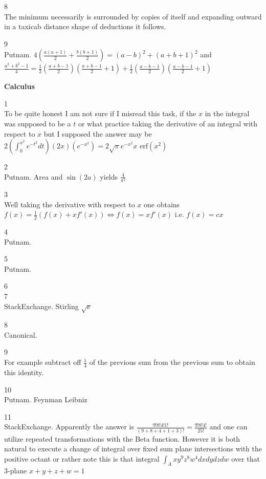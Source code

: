8 \\
The minimum necessarily is surrounded by copies of itself and expanding outward in a taxicab distance shape of deductions it follows.

9 \\
Putnam. $4\left(\frac{a(a+1)}{2}+\frac{b(b+1)}{2}\right)=(a-b)^2+(a+b+1)^2$ and $\frac{a^2+b^2-1}{4}=\frac{1}{2}\left(\frac{a+b-1}{2}\right)\left(\frac{a+b-1}{2}+1\right)+\frac{1}{2}\left(\frac{a-b-1}{2}\right)\left(\frac{a-b-1}{2}+1\right)$

\newpage

\textbf{Calculus}

1 \\
To be quite honest I am not sure if I misread this task, if the $x$ in the integral was supposed to be a $t$ or what practice taking the derivative of an integral with respect to $x$ but I supposed the answer may be $2\left(\int_0^{x^2}e^{-t^2}dt \right)(2x)(e^{-x^2})=\boxed{2\sqrt{\pi}e^{-x^2}x\text{ erf}(x^2)}$

2 \\
Putnam. Area and $\sin(2a)$ yields $\boxed{\frac{4}{\pi^2}}$

3 \\
Well taking the derivative with respect to $x$ one obtains $f(x)=\frac{1}{2}(f(x)+xf'(x)) \iff f(x)=xf'(x)$ i.e. $\boxed{f(x)=cx}$

4 \\
Putnam.

5 \\
Putnam.

6 \\


7 \\
StackExchange. Stirling $\boxed{\sqrt{e}}$

8 \\
Canonical.

9 \\
For example subtract off $\frac{1}{4}$ of the previous sum from the previous sum to obtain this identity.

10 \\
Putnam. Feynman Leibniz

11 \\
StackExchange. Apparently the answer is $\frac{9!8!4!1!}{(9+8+4+1+3)!}=\boxed{\frac{9!8!4!}{25!}}$ and one can utilize repeated transformations with the Beta function. However it is both natural to execute a change of integral over fixed sum plane intersections with the positive octant or rather note this is that integral $\int_A xy^9z^8w^4 dxdydzdw$ over that $3$-plane $x+y+z+w=1$

